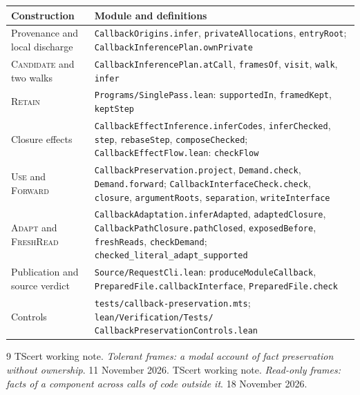 \documentclass[10pt,a4paper]{article}
\newcommand{\ruleName}[1]{\textcolor{rulec}{\textsc{#1}}}
\theoremstyle{definition}
\newcommand{\code}[1]{\textcolor{codec}{\texttt{#1}}}
\newcommand{\lean}[1]{\textcolor{leanc}{\texttt{\small #1}}}
\begin{document}
\begin{center}
\small
\begin{tabularx}{\linewidth}{@{}l>{\raggedright\arraybackslash}X@{}}
\toprule
Construction & Module and definitions \\
\midrule
Provenance and local discharge &
  \lean{CallbackOrigins.infer}, \lean{privateAllocations}, \lean{entryRoot};
  \lean{CallbackInferencePlan.ownPrivate} \\
\ruleName{Candidate} and two walks &
  \lean{CallbackInferencePlan.atCall}, \lean{framesOf}, \lean{visit},
  \lean{walk}, \lean{infer} \\
\ruleName{Retain} &
  \code{Programs/SinglePass.lean}:
  \lean{supportedIn}, \lean{framedKept}, \lean{keptStep} \\
Closure effects &
  \lean{CallbackEffectInference.inferCodes}, \lean{inferChecked},
  \lean{step}, \lean{rebaseStep}, \lean{composeChecked};
  \lean{CallbackEffectFlow.lean}: \lean{checkFlow} \\
\ruleName{Use} and \ruleName{Forward} &
  \lean{CallbackPreservation.project}, \lean{Demand.check},
  \lean{Demand.forward}; \lean{CallbackInterfaceCheck.check},
  \lean{closure}, \lean{argumentRoots}, \lean{separation}, \lean{writeInterface} \\
\ruleName{Adapt} and \ruleName{FreshRead} &
  \lean{CallbackAdaptation.inferAdapted}, \lean{adaptedClosure},
  \lean{CallbackPathClosure.pathClosed}, \lean{exposedBefore}, \lean{freshReads},
  \lean{checkDemand}; \lean{checked\_literal\_adapt\_supported} \\
Publication and source verdict &
  \code{Source/RequestCli.lean}: \lean{produceModuleCallback},
  \lean{PreparedFile.callbackInterface}, \lean{PreparedFile.check} \\
Controls &
  \code{tests/callback-preservation.mts}; \code{lean/Verification/Tests/}
  \code{CallbackPreservationControls.lean} \\
\bottomrule
\end{tabularx}
\end{center}

\begin{thebibliography}{9}
 TScert working note.
\emph{Tolerant frames: a modal account of fact preservation without ownership}.
11 November 2026.
 TScert working note.
\emph{Read-only frames: facts of a component across calls of code outside it}.
18 November 2026.
\end{thebibliography}
\end{document}
